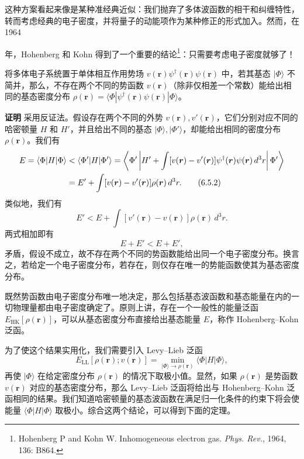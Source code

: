 这种方案看起来像是某种准经典近似：我们抛弃了多体波函数的相干和纠缠特性，转而考虑经典的电子密度，并将量子的动能项作为某种修正的形式加入。然而，在 1964

年，Hohenberg 和 Kohn 得到了一个重要的结论\footnote{Hohenberg P and Kohn W. Inhomogeneous electron gas. \emph{Phys. Rev.}, 1964, 136: B864.}：只需要考虑电子密度就够了！

\begin{keybox}
将多体电子系统置于单体相互作用势场 $v(\bm r)\psi^\dagger(\bm r)\psi(\bm r)$ 中，若其基态 $|\Phi\rangle$ 不简并，那么，不存在两个不同的势函数 $v(\bm r)$（除非仅相差一个常数）能给出相同的基态密度分布 $\rho(\bm r)=\langle\Phi|\psi^\dagger(\bm r)\psi(\bm r)|\Phi\rangle$。
\end{keybox}

\textbf{证明}
采用反证法。假设存在两个不同的外势 $v(\bm r),v'(\bm r)$，它们分别对应不同的哈密顿量 $H$ 和 $H'$，并且给出不同的基态 $|\Phi\rangle,|\Phi'\rangle$，却能给出相同的密度分布 $\rho(\bm r)$。我们有
\begin{align}
 E=\langle\Phi|H|\Phi\rangle
 &<\langle\Phi'|H|\Phi'\rangle
 =\left\langle\Phi'\left|H'+\int[v(\bm r)-v'(\bm r)]\psi^\dagger(\bm r)\psi(\bm r)\,d^3r\right|\Phi'\right\rangle\notag\\
 &=E'+\int[v(\bm r)-v'(\bm r)]\rho(\bm r)\,d^3r.
\tag{6.5.2}
\end{align}
类似地，我们有
\begin{equation}
 E'<E+\int[v'(\bm r)-v(\bm r)]\rho(\bm r)\,d^3r.
\tag{6.5.3}
\end{equation}
两式相加即有
\begin{equation}
 E+E'<E+E',
\tag{6.5.4}
\end{equation}
矛盾，假设不成立，故不存在两个不同的势函数能给出同一个电子密度分布。换言之，若给定一个电子密度分布，若存在，则仅存在唯一的势能函数使其为基态密度分布。

既然势函数由电子密度分布唯一地决定，那么包括基态波函数和基态能量在内的一切物理量都由电子密度确定了。原则上讲，存在一个一般性的能量泛函 $E_{\mathrm{HK}}[\rho(\bm r)]$，可以从基态密度分布直接给出基态能量 $E$，称作 Hohenberg--Kohn 泛函。

为了使这个结果实用化，我们需要引入 Levy--Lieb 泛函
\begin{equation}
 E_{\mathrm{LL}}[\rho(\bm r);v(\bm r)]
 =\min_{|\Phi\rangle\to\rho(\bm r)}\langle\Phi|H|\Phi\rangle,
\tag{6.5.5}
\end{equation}
再使 $|\Phi\rangle$ 在给定密度分布 $\rho(\bm r)$ 的情况下取极小值。显然，如果 $\rho(\bm r)$ 是势函数 $v(\bm r)$ 对应的基态密度分布，那么 Levy--Lieb 泛函将给出与 Hohenberg--Kohn 泛函相同的结果。我们知道哈密顿量的基态波函数在满足归一化条件的约束下将会使能量 $\langle\Phi|H|\Phi\rangle$ 取极小。综合这两个结论，可以得到下面的定理。

